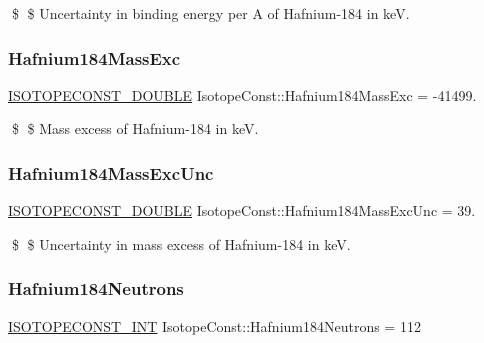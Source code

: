 \$ \$ Uncertainty in binding energy per A of Hafnium-\/184 in keV. \mbox{\label{group___isotope_const-_hafnium-_hf184_ga94a87b6ce593e097f009a3f9691684b0}} 
\subsubsection{\texorpdfstring{Hafnium184\+Mass\+Exc}{Hafnium184MassExc}}
{\footnotesize\ttfamily \mbox{\hyperlink{group___isotope_const-_macros_ga8f45a7272ce02c0b4c65c44636ed719a}{I\+S\+O\+T\+O\+P\+E\+C\+O\+N\+S\+T\+\_\+\+D\+O\+U\+B\+LE}} Isotope\+Const\+::\+Hafnium184\+Mass\+Exc = -\/41499.}

\$ \$ Mass excess of Hafnium-\/184 in keV. \mbox{\label{group___isotope_const-_hafnium-_hf184_ga58160aa6b195e27433348b6067664318}} 
\subsubsection{\texorpdfstring{Hafnium184\+Mass\+Exc\+Unc}{Hafnium184MassExcUnc}}
{\footnotesize\ttfamily \mbox{\hyperlink{group___isotope_const-_macros_ga8f45a7272ce02c0b4c65c44636ed719a}{I\+S\+O\+T\+O\+P\+E\+C\+O\+N\+S\+T\+\_\+\+D\+O\+U\+B\+LE}} Isotope\+Const\+::\+Hafnium184\+Mass\+Exc\+Unc = 39.}

\$ \$ Uncertainty in mass excess of Hafnium-\/184 in keV. \mbox{\label{group___isotope_const-_hafnium-_hf184_ga6eed64729fe5fe488eb3cf3976b71c16}} 
\subsubsection{\texorpdfstring{Hafnium184\+Neutrons}{Hafnium184Neutrons}}
{\footnotesize\ttfamily \mbox{\hyperlink{group___isotope_const-_macros_ga5f18360b3e99483a35c32d789e62621c}{I\+S\+O\+T\+O\+P\+E\+C\+O\+N\+S\+T\+\_\+\+I\+NT}} Isotope\+Const\+::\+Hafnium184\+Neutrons = 112}

